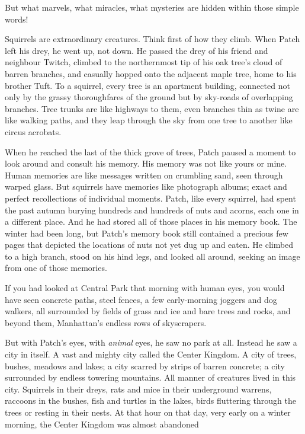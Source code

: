 \documentclass[11pt]{article}
\begin{document}
But what marvels, what miracles, what mysteries are hidden within those simple words!\par
Squirrels are extraordinary creatures. Think first of how they climb. When Patch left his drey, he went up, not down. He passed the drey of his friend and neighbour Twitch, climbed to the northernmost tip of his oak tree's cloud of barren branches, and casually hopped onto the adjacent maple tree, home to his brother Tuft. To a squirrel, every tree is an apartment building, connected not only by the grassy thoroughfares of the ground but by sky-roads of overlapping branches. Tree trunks are like highways to them, even branches thin as twine are like walking paths, and they leap through the sky from one tree to another like circus acrobats.\par
 When he reached the last of the thick grove of trees, Patch paused a moment to look around and consult his memory. His memory was not like yours or mine. Human memories are like messages written on crumbling sand, seen through warped glass. But squirrels have memories like photograph albums; exact and perfect recollections of individual moments. Patch, like every squirrel, had spent the past autumn burying hundreds and hundreds of nuts and acorns, each one in a different place. And he had stored all of those places in his memory book. The winter had been long, but Patch's memory book still contained a precious few pages that depicted the locations of nuts not yet dug up and eaten. He climbed to a high branch, stood on his hind legs, and looked all around, seeking an image from one of those memories.\par
 If you had looked at Central Park that morning with human eyes, you would have seen concrete paths, steel fences, a few early-morning joggers and dog walkers, all surrounded by fields of grass and ice and bare trees and rocks, and beyond them, Manhattan's endless rows of skyscrapers.\par
But with Patch's eyes, with {\it animal} eyes, he saw no park at all. Instead he saw a city in itself. A vast and mighty city called the Center Kingdom. A city of trees, bushes, meadows and lakes; a city scarred by strips of barren concrete; a city surrounded by endless towering mountains. All manner of creatures lived in this city. Squirrels in their dreys, rats and mice in their underground warrens, raccoons in the bushes, fish and turtles in the lakes, birds fluttering through the trees or resting in their nests. At that hour on that day, very early on a winter morning, the Center Kingdom was almost abandoned %
\end{document}
